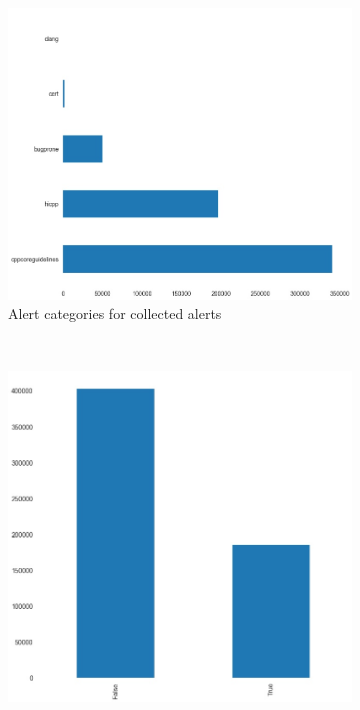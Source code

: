 \begin{figure}[H]
	\begin{subfigure}{\textwidth}
		\centering
		\includegraphics[scale=0.3]{./src/data_analysis/category_barh.jpg}
		\caption{Alert categories for collected alerts}\label{}
	\end{subfigure}\\
	\begin{subfigure}{.5\textwidth}
		\centering
		\includegraphics[scale=0.3]{./src/data_analysis/open_close_alerts.jpg}

\end{subfigure}
\end{figure}
